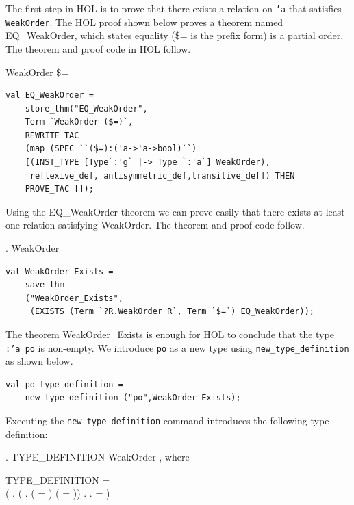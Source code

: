 The first step in HOL is to prove that there exists a relation on
\texttt{'a} that satisfies \texttt{WeakOrder}.  The HOL proof shown
below proves a theorem named EQ\_WeakOrder, which states equality (\$=
is the prefix form) is a partial order. The theorem and proof code in
HOL follow.

\HOLTokenTurnstile{} WeakOrder \$=
\begin{session}
\begin{verbatim}
val EQ_WeakOrder = 
    store_thm("EQ_WeakOrder",
	Term `WeakOrder ($=)`,
	REWRITE_TAC
	(map (SPEC ``($=):('a->'a->bool)``) 
	[(INST_TYPE [Type`:'g` |-> Type `:'a`] WeakOrder), 
	 reflexive_def, antisymmetric_def,transitive_def]) THEN
  	PROVE_TAC []);
\end{verbatim}
\end{session}

Using the EQ\_WeakOrder theorem we can prove easily that there exists
at least one relation satisfying WeakOrder.  The theorem and proof
code follow.

\HOLTokenTurnstile{} \HOLTokenExists{}. WeakOrder
\begin{session}
\begin{verbatim}
val WeakOrder_Exists =
    save_thm
    ("WeakOrder_Exists",
     (EXISTS (Term `?R.WeakOrder R`, Term `$=`) EQ_WeakOrder));
\end{verbatim}
\end{session}

The theorem WeakOrder\_Exists is enough for HOL to conclude that the
type \texttt{:'a po} is non-empty. We introduce \texttt{po} as a new
type using \texttt{new_type_definition} as shown below.
\begin{session}
\begin{verbatim}
val po_type_definition = 
    new_type_definition ("po",WeakOrder_Exists);
\end{verbatim}
\end{session}
Executing the \texttt{new\_type\_definition} command introduces the following type definition:

\HOLTokenTurnstile{}
\HOLTokenExists{}. TYPE_DEFINITION WeakOrder
, where

\HOLTokenTurnstile{} TYPE_DEFINITION =\\\hspace*{0.3in}
(\HOLTokenLambda{} .
(\HOLTokenForall{}
. (
 = 
) \HOLTokenImp{}
( = ))
\HOLTokenConj{} \HOLTokenForall{}. 
 \HOLTokenEquiv{}
\HOLTokenExists{}.  =
 )

